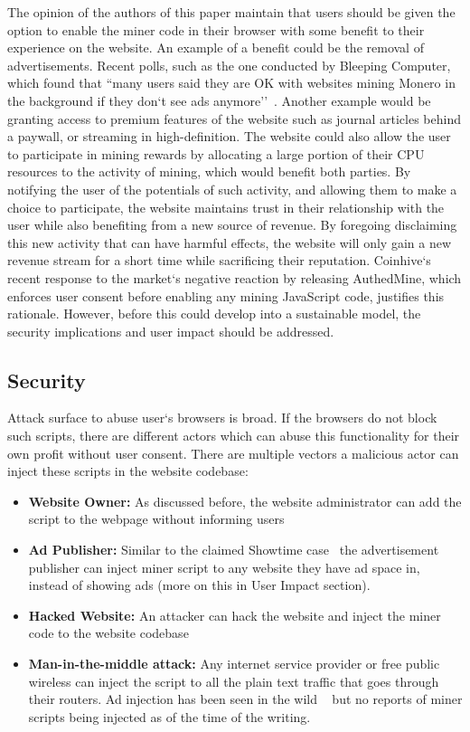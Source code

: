 The opinion of the authors of this paper maintain that users should be given the option to enable the miner code in their browser with some benefit to their experience on the website.  An example of a benefit could be the removal of advertisements. Recent polls, such as the one conducted by Bleeping Computer, which found that ``many users said they are OK with websites mining Monero in the background if they don`t see ads anymore''~\cite{bleepingcomputerminers}. Another example would be granting access to premium features of the website such as journal articles behind a paywall, or streaming in high-definition. The website could also allow the user to participate in mining rewards by allocating a large portion of their CPU resources to the activity of mining, which would benefit both parties. By notifying the user of the potentials of such activity, and allowing them to make a choice to participate, the website maintains trust in their relationship with the user while also benefiting from a new source of revenue. By foregoing disclaiming this new activity that can have harmful effects, the website will only gain a new revenue stream for a short time while sacrificing their reputation. Coinhive`s recent response to the market`s negative reaction by releasing AuthedMine, which enforces user consent before enabling any mining JavaScript code, justifies this rationale. However, before this could develop into a sustainable model, the security implications and user impact should be addressed.

\subsection{Security}
Attack surface to abuse user`s browsers is broad. If the browsers do not block such scripts, there are different actors which can abuse this functionality for their own profit without user consent. There are multiple vectors a malicious actor can inject these scripts in the website codebase:
\begin{itemize}
\item \textbf{Website Owner:} As discussed before, the website administrator can add the script to the webpage without informing users
\item \textbf{Ad Publisher:} Similar to the claimed Showtime case~\cite{showtimehive} the advertisement publisher can inject miner script to any website they have ad space in, instead of showing ads (more on this in User Impact section).
\item \textbf{Hacked Website:} An attacker can hack the website and inject the miner code to the website codebase
\item \textbf{Man-in-the-middle attack:} Any internet service provider or free public wireless can inject the script to all the plain text traffic that goes through their routers. Ad injection has been seen in the wild ~\cite{vergeadinjection} but no reports of miner scripts being injected as of the time of the writing.
\end{itemize}

